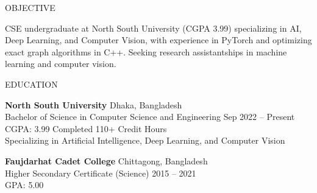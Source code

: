 \documentclass{resume}
\begin{document}
\begin{rSection}{OBJECTIVE}

CSE undergraduate at North South University (CGPA 3.99) specializing in AI, Deep Learning, and Computer Vision, with experience in PyTorch and optimizing exact graph algorithms in C++. Seeking research assistantships in machine learning and computer vision.



\end{rSection}

\begin{rSection}{EDUCATION}

{\bf North South University} \hfill Dhaka, Bangladesh \\
Bachelor of Science in Computer Science and Engineering \hfill Sep 2022 -- Present \\
CGPA: 3.99 \hfill Completed 110+ Credit Hours \\
Specializing in Artificial Intelligence, Deep Learning, and Computer Vision

{\bf Faujdarhat Cadet College} \hfill Chittagong, Bangladesh \\
Higher Secondary Certificate (Science) \hfill 2015 -- 2021 \\
GPA: 5.00

\end{rSection}
\end{document}
